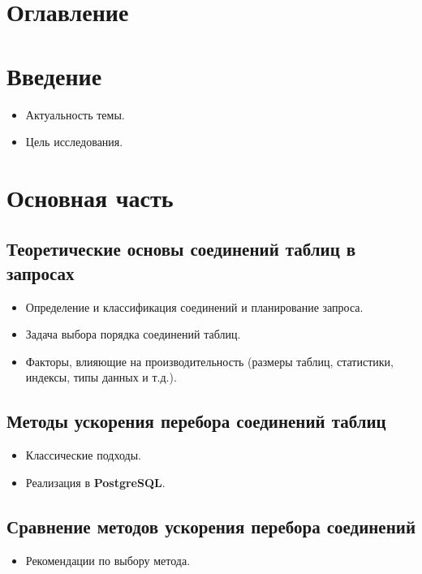 \documentclass[12pt]{article}
\begin{document}


\begin{flushleft}

\newpage


\centering \section*{Оглавление}
\raggedright
{}

\section*{Введение}
\begin{itemize}
    \item Актуальность темы.
    \item Цель исследования.
\end{itemize}

\section*{Основная часть}

\subsection*{Теоретические основы соединений таблиц в запросах}
\begin{itemize}
    \item Определение и классификация соединений и планирование запроса.
    \item Задача выбора порядка соединений таблиц.
    \item Факторы, влияющие на производительность (размеры таблиц, статистики, индексы, типы данных и т.д.).
\end{itemize}

\subsection*{Методы ускорения перебора соединений таблиц}
\begin{itemize}
    \item Классические подходы.
    \item Реализация в \textbf{PostgreSQL}.
\end{itemize}

\subsection*{Сравнение методов ускорения перебора соединений}
\begin{itemize}
    \item Рекомендации по выбору метода.
\end{itemize}


\end{flushleft}
\end{document}
